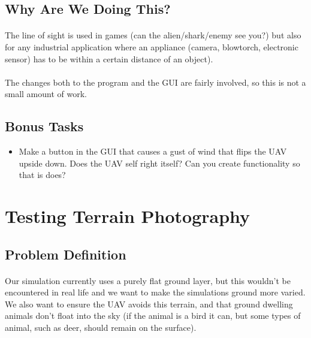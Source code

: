 \documentclass[11pt]{book}
\begin{document}
\subsection{Why Are We Doing This?}

\paragraph{} The line of sight is used in games (can the alien/shark/enemy see you?) but also for any industrial application where an appliance (camera, blowtorch, electronic sensor) has to be within a certain distance of an object).

\paragraph{} The changes both to the program and the GUI are fairly involved, so this is not a small amount of work.

\subsection{Bonus Tasks}

\begin{itemize}
\item Make a button in the GUI that causes a gust of wind that flips the UAV upside down. Does the UAV self right itself? Can you create functionality so that is does?
\end{itemize}

\clearpage




\section{Testing Terrain Photography}

\subsection{Problem Definition}

\paragraph{} Our simulation currently uses a purely flat ground layer, but this wouldn't be encountered in real life and we want to make the simulations ground more varied. We also want to ensure the UAV avoids this terrain, and that ground dwelling animals don't float into the sky (if the animal is a bird it can, but some types of animal, such as deer, should remain on the surface).
\end{document}
